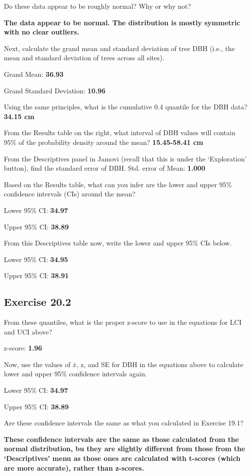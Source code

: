 \documentclass[
  openany]{krantz}
\begin{document}
Do these data appear to be roughly normal? Why or why not?

\textbf{The data appear to be normal. The distribution is mostly symmetric with no clear outliers.}

Next, calculate the grand mean and standard deviation of tree DBH (i.e., the mean and standard deviation of trees across all sites).

Grand Mean: \textbf{36.93}

Grand Standard Deviation: \textbf{10.96}

Using the same principles, what is the cumulative 0.4 quantile for the DBH data? \textbf{34.15 cm}

From the Results table on the right, what interval of DBH values will contain 95\% of the probability density around the mean? \textbf{15.45-58.41 cm}

From the Descriptives panel in Jamovi (recall that this is under the `Exploration'
button), find the standard error of DBH. Std. error of Mean: \textbf{1.000}

Based on the Results table, what can you infer are the lower and upper 95\%
confidence intervals (CIs) around the mean?

Lower 95\% CI: \textbf{34.97}

Upper 95\% CI: \textbf{38.89}

From this Descriptives table now, write the lower and upper 95\% CIs below.

Lower 95\% CI: \textbf{34.95}

Upper 95\% CI: \textbf{38.91}

\hypertarget{exercise-20.2}{%
\subsection{Exercise 20.2}\label{exercise-20.2}}

From these quantiles, what is the proper z-score to use in the equations for LCI
and UCI above?

z-score: \textbf{1.96}

Now, use the values of \(\bar{x}\), z, and SE for DBH in the equations above to calculate lower and upper 95\% confidence intervals again.

Lower 95\% CI: \textbf{34.97}

Upper 95\% CI: \textbf{38.89}

Are these confidence intervals the same as what you calculated in Exercise 19.1?

\textbf{These confidence intervals are the same as those calculated from the normal distribution, bu they are slightly different from those from the `Descriptives' menu as those ones are calculated with t-scores (which are more accurate), rather than z-scores.}
\end{document}
